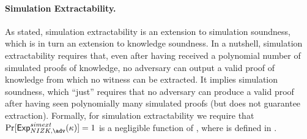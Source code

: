\paragraph{Simulation Extractability.} As stated, simulation extractability
is an extension to simulation soundness, which is in turn an extension to
knowledge soundness. In a nutshell,
simulation extractability requires that, even after having received a polynomial
number of simulated proofs of knowledge, no adversary can output a valid proof
of knowledge from which no witness can be extracted. It implies simulation
soundness, which ``just'' requires that no adversary can produce a valid proof
after having seen polynomially many simulated proofs (but does not guarantee
extraction). Formally, for simulation extractability we require that
$\Pr[\ExpNIZKSimExt(\secpar)] = 1$ is a negligible function of \secpar,
where \ExpNIZKSimExt is defined in .

